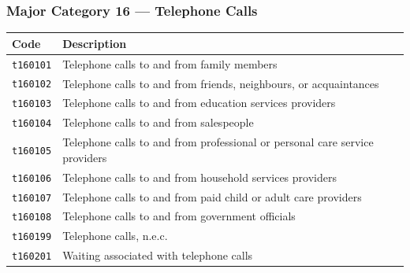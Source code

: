 \documentclass[11pt, a4paper]{article}
\begin{document}
\subsubsection*{Major Category 16 --- Telephone Calls}
\begin{longtable}{L{3cm} L{13cm}}
\toprule \textbf{Code} & \textbf{Description} \\ \midrule \endhead
\bottomrule \endfoot
\texttt{t160101} & Telephone calls to and from family members \\
 \texttt{t160102} & Telephone calls to and from friends, neighbours, or acquaintances \\
\texttt{t160103} & Telephone calls to and from education services providers \\
 \texttt{t160104} & Telephone calls to and from salespeople \\
\texttt{t160105} & Telephone calls to and from professional or personal care service providers \\
 \texttt{t160106} & Telephone calls to and from household services providers \\
\texttt{t160107} & Telephone calls to and from paid child or adult care providers \\
 \texttt{t160108} & Telephone calls to and from government officials \\
\texttt{t160199} & Telephone calls, n.e.c. \\
 \texttt{t160201} & Waiting associated with telephone calls \\
\end{longtable}
\end{document}
